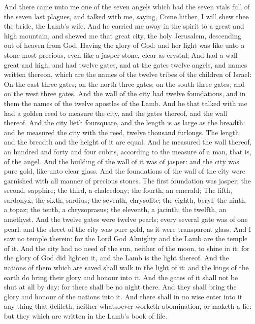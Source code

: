 And there came unto me one of the seven angels which had
the seven vials full of the seven last plagues, and talked with me,
saying, Come hither, I will shew thee the bride, the Lamb's wife.
 And he carried me away in the spirit to a great and high
mountain, and shewed me that great city, the holy Jerusalem, descending
out of heaven from God,  Having the glory of God: and her
light was like unto a stone most precious, even like a jasper stone,
clear as crystal;  And had a wall great and high, and had
twelve gates, and at the gates twelve angels, and names written thereon,
which are the names of the twelve tribes of the children of Israel:
 On the east three gates; on the north three gates; on
the south three gates; and on the west three gates.  And
the wall of the city had twelve foundations, and in them the names of
the twelve apostles of the Lamb.  And he that talked with
me had a golden reed to measure the city, and the gates thereof, and the
wall thereof.  And the city lieth foursquare, and the
length is as large as the breadth: and he measured the city with the
reed, twelve thousand furlongs. The length and the breadth and the
height of it are equal.  And he measured the wall
thereof, an hundred and forty and four cubits, according to the measure
of a man, that is, of the angel.  And the building of the
wall of it was of jasper: and the city was pure gold, like unto clear
glass.  And the foundations of the wall of the city were
garnished with all manner of precious stones. The first foundation was
jasper; the second, sapphire; the third, a chalcedony; the fourth, an
emerald;  The fifth, sardonyx; the sixth, sardius; the
seventh, chrysolite; the eighth, beryl; the ninth, a topaz; the tenth, a
chrysoprasus; the eleventh, a jacinth; the twelfth, an amethyst.
 And the twelve gates were twelve pearls; every several
gate was of one pearl: and the street of the city was pure gold, as it
were transparent glass.  And I saw no temple therein: for
the Lord God Almighty and the Lamb are the temple of it. 
And the city had no need of the sun, neither of the moon, to shine in
it: for the glory of God did lighten it, and the Lamb is the light
thereof.  And the nations of them which are saved shall
walk in the light of it: and the kings of the earth do bring their glory
and honour into it.  And the gates of it shall not be
shut at all by day: for there shall be no night there. 
And they shall bring the glory and honour of the nations into it.
 And there shall in no wise enter into it any thing that
defileth, neither whatsoever worketh abomination, or maketh a lie: but
they which are written in the Lamb's book of life.

